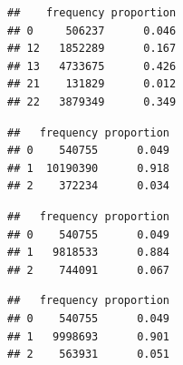 \documentclass[
]{article}
\newenvironment{Shaded}{\begin{snugshade}}{\end{snugshade}}
\newcommand{\CommentTok}[1]{\textcolor[rgb]{0.56,0.35,0.01}{\textit{#1}}}
\newcommand{\FunctionTok}[1]{\textcolor[rgb]{0.13,0.29,0.53}{\textbf{#1}}}
\newcommand{\NormalTok}[1]{#1}
\newcommand{\SpecialCharTok}[1]{\textcolor[rgb]{0.81,0.36,0.00}{\textbf{#1}}}
\begin{document}
\begin{Shaded}
\end{Shaded}

\begin{verbatim}
##    frequency proportion
## 0     506237      0.046
## 12   1852289      0.167
## 13   4733675      0.426
## 21    131829      0.012
## 22   3879349      0.349
\end{verbatim}

\begin{Shaded}
\end{Shaded}

\begin{verbatim}
##   frequency proportion
## 0    540755      0.049
## 1  10190390      0.918
## 2    372234      0.034
\end{verbatim}

\begin{Shaded}
\end{Shaded}

\begin{verbatim}
##   frequency proportion
## 0    540755      0.049
## 1   9818533      0.884
## 2    744091      0.067
\end{verbatim}

\begin{Shaded}
\end{Shaded}

\begin{verbatim}
##   frequency proportion
## 0    540755      0.049
## 1   9998693      0.901
## 2    563931      0.051
\end{verbatim}

\begin{Shaded}
\end{Shaded}
\end{document}
